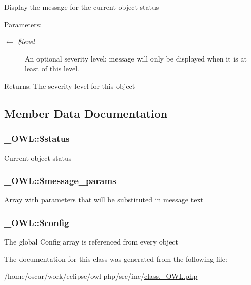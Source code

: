 Display the message for the current object status

\begin{Desc}
\item[Parameters:]
\begin{description}
\item[\mbox{$\leftarrow$} {\em \$level}]An optional severity level; message will only be displayed when it is at least of this level. \end{description}
\end{Desc}
\begin{Desc}
\item[Returns:]The severity level for this object \end{Desc}


\subsection{Member Data Documentation}
\hypertarget{class__OWL_af448f6bc8a90e20c09e9e2b8fe46eb5}{
\subsubsection{\setlength{\rightskip}{0pt plus 5cm}\_\-OWL::\$status}}
\label{class__OWL_af448f6bc8a90e20c09e9e2b8fe46eb5}


Current object status \hypertarget{class__OWL_9cd573fffbb55aa42f29d83b39308528}{
\subsubsection{\setlength{\rightskip}{0pt plus 5cm}\_\-OWL::\$message\_\-params}}
\label{class__OWL_9cd573fffbb55aa42f29d83b39308528}


Array with parameters that will be substituted in message text \hypertarget{class__OWL_f37a011667dda12fc417a68a6f3077d1}{
\subsubsection{\setlength{\rightskip}{0pt plus 5cm}\_\-OWL::\$config}}
\label{class__OWL_f37a011667dda12fc417a68a6f3077d1}


The global Config array is referenced from every object 

The documentation for this class was generated from the following file:\begin{CompactItemize}
\item 
/home/oscar/work/eclipse/owl-php/src/inc/\hyperlink{class_8__OWL_8php}{class.\_\-OWL.php}\end{CompactItemize}
